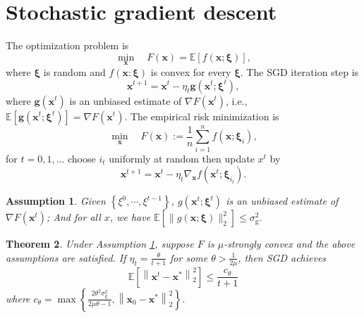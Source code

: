 \documentclass[12pt]{article}
\numberwithin{equation}{section}
\newtheorem{theorem}{Theorem}[section]
\newtheorem{assumption}[theorem]{Assumption}
\begin{document}
\section{Stochastic gradient descent}

The optimization problem is
$$
\min_{\boldsymbol{x}} \quad F(\boldsymbol{x})=\mathbb{E}[f(\boldsymbol{x} ; \boldsymbol{\xi})],
$$
where $\boldsymbol{\xi}$ is random and $f(\boldsymbol{x} ; \boldsymbol{\xi})$ is convex for every $\boldsymbol{\xi}$. The SGD iteration step is
$$
\boldsymbol{x}^{t+1}=\boldsymbol{x}^{t}-\eta_{t} \boldsymbol{g}\left(\boldsymbol{x}^{t} ; \boldsymbol{\xi}^{t}\right),
$$
where $\boldsymbol{g}\left(\boldsymbol{x}^{t}\right)$ is an unbiased estimate of $\nabla F\left(\boldsymbol{x}^{t}\right)$, i.e., 
$\mathbb{E}\left[\boldsymbol{g}\left(\boldsymbol{x}^{t} ; \boldsymbol{\xi}^{t}\right)\right]=\nabla F\left(\boldsymbol{x}^{t}\right)$.
The empirical risk minimization is
$$
\min_{\boldsymbol{x}} \quad F(\boldsymbol{x}):=\frac{1}{n} \sum_{i=1}^{n} f\left(\boldsymbol{x} ;\boldsymbol{\xi}_i\right),
$$
for $t=0,1,...$ choose $i_t$ uniformly at random then update $x^{t}$ by
$$
\boldsymbol{x}^{t+1}=\boldsymbol{x}^{t}-\eta_{t} \nabla_{\boldsymbol{x}} f\left(\boldsymbol{x}^{t} ;\boldsymbol{\xi}_{i_t}\right).
$$
\begin{assumption} \label{assumption 5.3}
	Given $\left\{\xi^{0}, \cdots, \xi^{t-1}\right\}$, $g\left(\boldsymbol{x}^{t} ; \boldsymbol{\xi}^{t}\right)$ is an unbiased estimate of $\nabla F\left(\boldsymbol{x}^{t}\right)$; And for all $x$, we have $\mathbb{E}\left[\|g(\boldsymbol{x} ; \boldsymbol{\xi})\|_{2}^{2}\right] \leq \sigma_{\mathrm{g}}^{2}$.
\end{assumption}
\begin{theorem}
	Under Assumption \ref{assumption 5.3},  suppose $F$ is $\mu$-strongly convex and the above assumptions are satisfied. If $\eta_{t}=\frac{\theta}{t+1}$ for some $\theta>\frac{1}{2 \mu}$, then SGD achieves
	$$
	\mathbb{E}\left[\left\|\boldsymbol{x}^{t}-\boldsymbol{x}^{*}\right\|_{2}^{2}\right] \leq \frac{c_{\theta}}{t+1}
	$$
	where $c_{\theta}=\max \left\{\frac{2 \theta^{2} \sigma_{\mathrm{g}}^{2}}{2 \mu \theta-1},\left\|\boldsymbol{x}_{0}-\boldsymbol{x}^{*}\right\|_{2}^{2}\right\}$.
\end{theorem}
\end{document}
